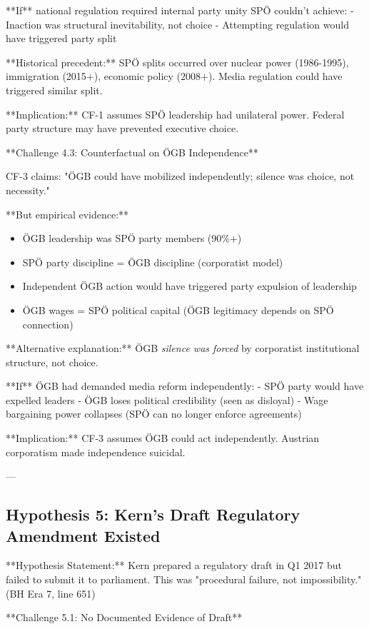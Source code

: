 **If** national regulation required internal party unity SPÖ couldn't achieve:
- Inaction was structural inevitability, not choice
- Attempting regulation would have triggered party split

**Historical precedent:** SPÖ splits occurred over nuclear power (1986-1995), immigration (2015+), economic policy (2008+). Media regulation could have triggered similar split.

**Implication:** CF-1 assumes SPÖ leadership had unilateral power. Federal party structure may have prevented executive choice.

**Challenge 4.3: Counterfactual on ÖGB Independence**

CF-3 claims: "ÖGB could have mobilized independently; silence was choice, not necessity."

**But empirical evidence:**
\begin{itemize}
\item ÖGB leadership was SPÖ party members (90\%+)
\item SPÖ party discipline = ÖGB discipline (corporatist model)
\item Independent ÖGB action would have triggered party expulsion of leadership
\item ÖGB wages = SPÖ political capital (ÖGB legitimacy depends on SPÖ connection)
\end{itemize}

**Alternative explanation:** ÖGB \textit{silence was forced} by corporatist institutional structure, not choice.

**If** ÖGB had demanded media reform independently:
- SPÖ party would have expelled leaders
- ÖGB loses political credibility (seen as disloyal)
- Wage bargaining power collapses (SPÖ can no longer enforce agreements)

**Implication:** CF-3 assumes ÖGB could act independently. Austrian corporatism made independence suicidal.

---

\subsection*{Hypothesis 5: Kern's Draft Regulatory Amendment Existed}

**Hypothesis Statement:** Kern prepared a regulatory draft in Q1 2017 but failed to submit it to parliament. This was "procedural failure, not impossibility." (BH Era 7, line 651)

**Challenge 5.1: No Documented Evidence of Draft**


